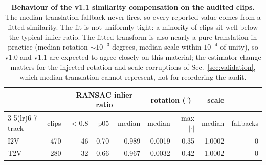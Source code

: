 \begin{table}[tb]
\centering
\footnotesize
\begin{tabular}{lrrrrrrrr}
\toprule
& & \multicolumn{3}{c}{RANSAC inlier ratio} & \multicolumn{2}{c}{rotation ($^\circ$)} & scale & \\
\cmidrule(lr){3-5}\cmidrule(lr){6-7}
track & clips & $<0.8$ & p05 & median & median & max $|\cdot|$ & median & fallbacks \\
\midrule
I2V & 470 & 46 & 0.70 & 0.989 & 0.0019 & 0.35 & 1.0002 & 0 \\
T2V & 280 & 32 & 0.66 & 0.967 & 0.0032 & 0.42 & 1.0002 & 0 \\
\bottomrule
\end{tabular}
\caption{\textbf{Behaviour of the v1.1 similarity compensation on the audited clips.} The median-translation fallback never fires, so every reported value comes from a fitted similarity. The fit is not uniformly tight: a minority of clips sit well below the typical inlier ratio. The fitted transform is also nearly a pure translation in practice (median rotation $\sim10^{-3}$ degrees, median scale within $10^{-4}$ of unity), so v1.0 and v1.1 are expected to agree closely on this material; the estimator change matters for the injected-rotation and scale corruptions of Sec.~\ref{sec:validation}, which median translation cannot represent, not for reordering the audit.}
\label{tab:compensation}
\end{table}